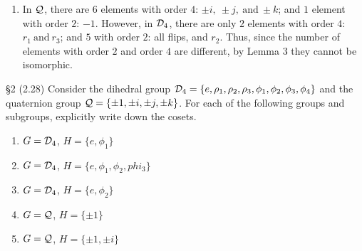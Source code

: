 \documentclass{homework}
\begin{document}
\begin{solution}
\begin{enumerate}[label=(\alph*)]
    \item In $\mathcal{Q}$, there are $6$ elements with order $4$: $\pm i,\ \pm j,~\text{and}~\pm k$; and
      $1$ element with order $2$: $-1$. However, in $\mathcal{D}_4$, there are only $2$ elements with order
      $4$: $r_1 ~\text{and}~r_3$; and $5$ with order $2$: all flips, and $r_2$. Thus, since the
      number of elements with order $2$ and order $4$ are different, by Lemma 3 they cannot be
      isomorphic.
  \end{enumerate}
\end{solution}


\begin{problem}{\S 2}
  (2.28) Consider the dihedral group $\mathcal{D}_4=\{ e,\rho_1,\rho_2,\rho_3,\phi_1,\phi_2,\phi_3,\phi_4\}$
  and the quaternion group $\mathcal{Q}=\{ \pm 1,\pm i,\pm j,\pm k \}$. For each of the following groups
  and subgroups, explicitly write down the cosets.
  \begin{enumerate}[label=(\alph*)]
    \item $G=\mathcal{D}_4$, $H=\{ e,\phi_1 \}$
    \item $G=\mathcal{D}_4$, $H=\{e, \phi_1,\phi_2,phi_3\}$
    \item $G=\mathcal{D}_4$, $H=\{ e, \phi_2 \}$
    \item $G=\mathcal{Q}$, $H=\{ \pm 1 \}$
    \item $G=\mathcal{Q}$, $H=\{ \pm 1, \pm i \}$
  \end{enumerate}
\end{problem}
\end{document}
